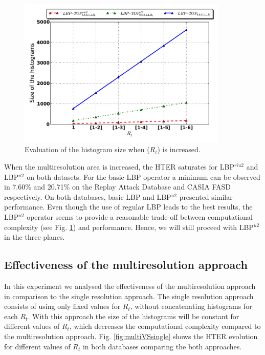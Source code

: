 \begin{figure}[!btb]
\begin{center}
\includegraphics [width=10cm] {images/proposed_countermeasure/dimIncrease.pdf}
\caption{Evaluation of the histogram size when ($R_t$) is increased.} 
\label{fig:dimIncrease}
\end{center}
\end{figure}

When the multiresolution area is increased, the HTER saturates for LBP$^{riu2}$ and LBP$^{u2}$ on both datasets. For the basic LBP operator a minimum can be observed in 7.60\% and 20.71\% on the Replay Attack Database and CASIA FASD respectively. On both databases, basic LBP and LBP$^{u2}$ presented similar performance. Even though the use of regular LBP leads to the best results, the LBP$^{u2}$ operator seems to provide a reasonable trade-off between computational complexity (see Fig. \ref{fig:dimIncrease}) and performance. Hence, we will still proceed with LBP$^{u2}$ in the three planes.

\subsection{Effectiveness of the multiresolution approach}
\label{sec_multiresolution}

In this experiment we analysed the effectiveness of the multiresolution approach in comparison to the single resolution approach. The single resolution approach consists of using only fixed values for $R_t$, without concatenating histograms for each $R_t$. With this approach the size of the histograms will be constant for different values of $R_t$, which decreases the computational complexity compared to the multiresolution approach. Fig. \ref{fig:multiVSsingle} shows the HTER evolution for different values of $R_t$ in both databases comparing the both approaches.

